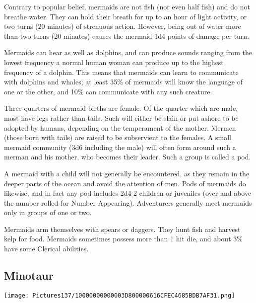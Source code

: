 \documentclass[a4paper,twoside,openany,10pt]{book}
\begin{document}
\begin{multicols}{2}
Contrary to popular belief, mermaids are not fish (nor even half fish) and do not breathe water. They can hold their breath for up to an hour of light activity, or two turns (20 minutes) of strenuous action. However, being out of water more than two turns (20 minutes) causes the mermaid 1d4 points of damage per turn.

Mermaids can hear as well as dolphins, and can produce sounds ranging from the lowest frequency a normal human woman can produce up to the highest frequency of a dolphin. This means that mermaids can learn to communicate with dolphins and whales; at least 35\% of mermaids will know the language of one or the other, and 10\% can communicate with any such creature.

Three-quarters of mermaid births are female. Of the quarter which are male, most have legs rather than tails. Such will either be slain or put ashore to be adopted by humans, depending on the temperament of the mother. Mermen (those born with tails) are raised to be subservient to the females. A small mermaid community (3d6 including the male) will often form around such a merman and his mother, who becomes their leader. Such a group is called a pod.

A mermaid with a child will not generally be encountered, as they remain in the deeper parts of the ocean and avoid the attention of men. Pods of mermaids do likewise, and in fact any pod includes 2d4-2 children or juveniles (over and above the number rolled for Number Appearing). Adventurers generally meet mermaids only in groups of one or two.

Mermaids arm themselves with spears or daggers. They hunt fish and harvest kelp for food. Mermaids sometimes possess more than 1 hit die, and about 3\% have some Clerical abilities.

\subsection*{Minotaur}\label{minotaur}


\begin{center} \texttt{[image: Pictures137/10000000000003D800000616CFEC4685BDB7AF31.png]} \end{center}


\end{multicols}
\end{document}
